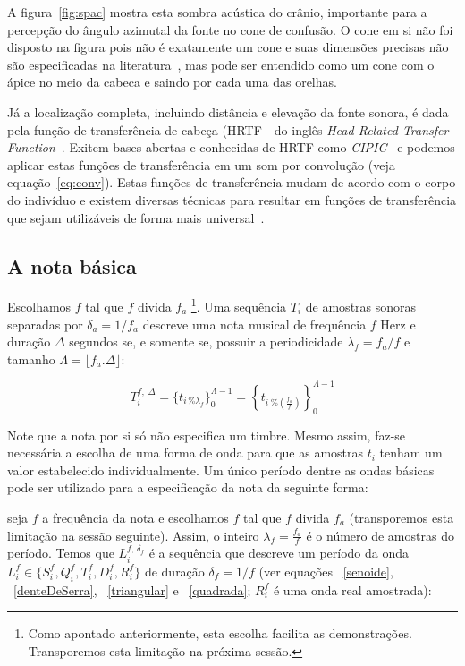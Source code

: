 A figura~\ref{fig:spac} mostra esta sombra acústica do crânio, importante para a percepção do ângulo azimutal da fonte no cone de confusão. O cone em si não foi disposto na figura pois não é exatamente um cone e suas dimensões precisas não são especificadas na literatura~\cite{confCone}, mas pode ser entendido como um cone com o ápice no meio da cabeca e saindo por cada uma das orelhas.

Já a localização completa, incluindo distância e elevação da fonte sonora, é dada pela função de transferência de cabeça (HRTF - do inglês \emph{Head Related Transfer Function}~\cite{hrtf}. Exitem bases abertas e conhecidas de HRTF como \emph{CIPIC}~\cite{CIPIC} e podemos aplicar estas funções de transferência em um som por convolução (veja equação~\ref{eq:conv}). Estas funções de transferência mudam de acordo com o corpo do indivíduo e existem diversas técnicas para resultar em funções de transferência que sejam utilizáveis de forma mais universal~\cite{lazaSPA}. 


\subsection{A nota básica}\label{notaBasica}

Escolhamos $f$ tal que $f$ divida $f_a$  
 \footnote{Como apontado anteriormente, esta escolha facilita as demonstrações.
Transporemos esta limitação na próxima sessão.}. 
Uma sequência $T_i$ de amostras sonoras separadas por $\delta_a=1/f_a$ descreve uma nota musical de frequência $f$ Herz e duração $\Delta$ segundos se, e somente se, possuir a periodicidade $\lambda_f=f_a/f$
 e tamanho $\Lambda=\lfloor f_a . \Delta \rfloor $:

\begin{equation}
T_i^{f,\; \Delta}=\{t_{i \, \% \lambda_f} \}_0^{\Lambda-1}= \left \{t_{i \; \% \left( \frac{f_a}{f} \right) } \right \}_0^{\Lambda-1}
\end{equation}

Note que a nota por si só não especifica um timbre. Mesmo assim, faz-se necessária a escolha de uma forma de onda para que as amostras $t_i$ tenham um valor estabelecido individualmente. Um único período dentre as ondas básicas pode ser utilizado para a especificação da nota da seguinte forma:

seja $f$ a frequência da nota e escolhamos $f$ tal que $f$ divida $f_a$ (transporemos esta limitação na sessão seguinte). Assim, o inteiro $\lambda_f=\frac{f_a}{f}$ é o número de amostras do período. Temos que $L_i^{f,\, \delta_f} $ é
a sequência que descreve um período da onda $L_i^f \in \{S_i^f,Q_i^f,T_i^f,D_i^f,R_i^f \}$ de duração 
$\delta_f=1/f$ (ver equações ~\ref{senoide}, ~\ref{denteDeSerra}, ~\ref{triangular} e ~\ref{quadrada}; $R_i^f$ 
é uma onda real amostrada):

